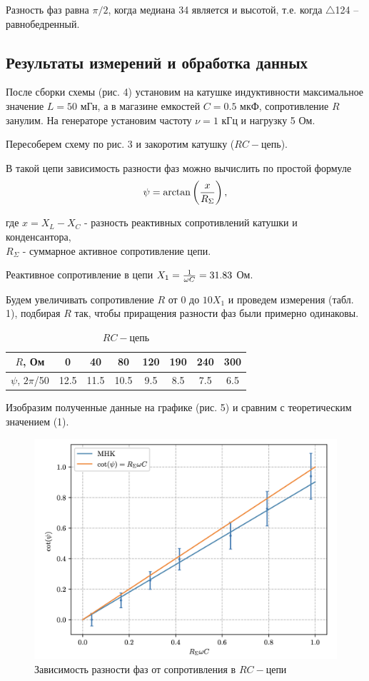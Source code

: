 \documentclass[12pt,a4paper]{article}
\begin{document}
Разность фаз равна $\pi/2$, когда медиана 34 является и высотой, т.е. когда $\triangle$124 – равнобедренный.

\subsection*{Результаты измерений и обработка данных}
После сборки схемы (рис. 4) установим на катушке индуктивности максимальное значение $L = 50$ мГн, а в магазине емкостей $C = 0.5$ мкФ, сопротивление $R$ занулим.
На генераторе установим частоту $\nu = 1$ кГц и нагрузку 5 Ом.

Пересоберем схему по рис. 3 и закоротим катушку ($RC-$цепь).

В такой цепи зависимость разности фаз можно вычислить по простой формуле 
\begin{equation}
    \psi = \arctan\left({x \over R_\Sigma}\right),
\end{equation}

где $x = X_L - X_C$ - разность реактивных сопротивлений катушки и конденсантора, \\$R_\Sigma$ - суммарное активное сопротивление цепи.

Реактивное сопротивление в цепи $X_1 = {1\over \omega C} = 31.83$ Ом.

Будем увеличивать сопротивление $R$ от 0 до $10X_1$ и проведем измерения (табл. 1), подбирая $R$ так, чтобы приращения разности фаз были примерно одинаковы.
\begin{table}[H]
    \centering
    \begin{tabular}{|c|c|c|c|c|c|c|c|}
        \hline
        $R$, Ом &0&40&80&120&190&240&300\\
        \hline
        $\psi$, $2\pi$/50 & 12.5 & 11.5&10.5&9.5&8.5&7.5&6.5\\
        \hline
    \end{tabular}
    \caption{$RC - $цепь}
\end{table}

Изобразим полученные данные на графике (рис. 5) и сравним с теоретическим значением (1).

\begin{figure}[h]
    \centering
    \includegraphics[width=0.6\linewidth]{1.png}
    \caption{Зависимость разности фаз от сопротивления в $RC-$цепи}
\end{figure}
\end{document}

